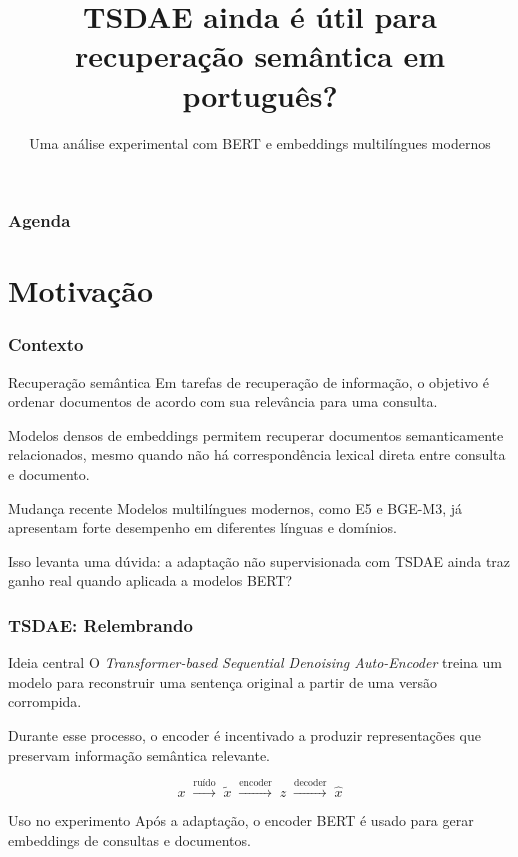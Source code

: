 \documentclass[aspectratio=169]{beamer}
\title{TSDAE ainda é útil para recuperação semântica em português?}
\subtitle{Uma análise experimental com BERT e embeddings multilíngues modernos}
\institute{
Instituto de Informática --- UFRGS
}
\providecommand{\InfTitlePage}{
  \begin{frame}[plain]
    \titlepage
  \end{frame}
}
\begin{document}
\InfTitlePage

\begin{frame}
  \frametitle{Agenda}
  \tableofcontents
\end{frame}

\section{Motivação}

\begin{frame}
\frametitle{Contexto}

\begin{block}{Recuperação semântica}
Em tarefas de recuperação de informação, o objetivo é ordenar documentos de acordo com sua relevância para uma consulta.

\vspace{0.15cm}

Modelos densos de embeddings permitem recuperar documentos semanticamente relacionados, mesmo quando não há correspondência lexical direta entre consulta e documento.
\end{block}

\vspace{0.25cm}

\begin{block}{Mudança recente}
Modelos multilíngues modernos, como E5 e BGE-M3, já apresentam forte desempenho em diferentes línguas e domínios.

\vspace{0.15cm}

Isso levanta uma dúvida: a adaptação não supervisionada com TSDAE ainda traz ganho real quando aplicada a modelos BERT?
\end{block}

\end{frame}

\begin{frame}
\frametitle{TSDAE: Relembrando}

\begin{block}{Ideia central}
O \textit{Transformer-based Sequential Denoising Auto-Encoder} treina um modelo para reconstruir uma sentença original a partir de uma versão corrompida.

\vspace{0.2cm}

Durante esse processo, o encoder é incentivado a produzir representações que preservam informação semântica relevante.
\end{block}

\vspace{0.25cm}

\[
x
\;\xrightarrow{\text{ruído}}\;
\tilde{x}
\;\xrightarrow{\text{encoder}}\;
z
\;\xrightarrow{\text{decoder}}\;
\hat{x}
\]

\vspace{0.15cm}

\begin{alertblock}{Uso no experimento}
Após a adaptação, o encoder BERT é usado para gerar embeddings de consultas e documentos.
\end{alertblock}

\end{frame}
\end{document}
